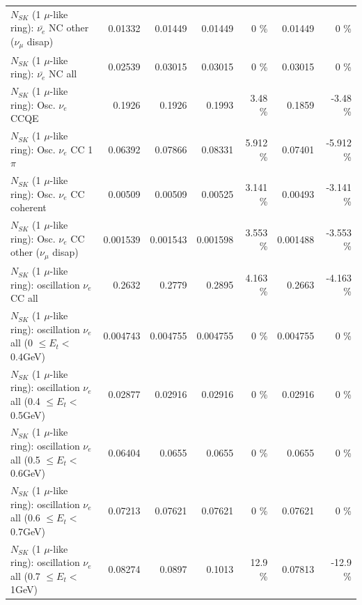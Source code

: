 \begin{table}
\begin{tabular}{| l | r | r | r  r | r  r |}
          $N_{SK}$ (1 $\mu$-like ring): $\bar{\nu_e}$ NC other ($\nu_\mu$ disap) &         0.01332 &         0.01449 &         0.01449 &        0 \%  &         0.01449 &        0 \%  \\ 
                            $N_{SK}$ (1 $\mu$-like ring): $\bar{\nu_{e}}$ NC all &         0.02539 &         0.03015 &         0.03015 &        0 \%  &         0.03015 &        0 \%  \\ 
\hline
\hline
\hline
                                 $N_{SK}$ (1 $\mu$-like ring): Osc. $\nu_e$ CCQE &          0.1926 &          0.1926 &          0.1993 &     3.48 \%  &          0.1859 &    -3.48 \%  \\ 
                            $N_{SK}$ (1 $\mu$-like ring): Osc. $\nu_e$ CC 1$\pi$ &         0.06392 &         0.07866 &         0.08331 &    5.912 \%  &         0.07401 &   -5.912 \%  \\ 
                          $N_{SK}$ (1 $\mu$-like ring): Osc. $\nu_e$ CC coherent &         0.00509 &         0.00509 &         0.00525 &    3.141 \%  &         0.00493 &   -3.141 \%  \\ 
           $N_{SK}$ (1 $\mu$-like ring): Osc. $\nu_e$ CC other ($\nu_\mu$ disap) &        0.001539 &        0.001543 &        0.001598 &    3.553 \%  &        0.001488 &   -3.553 \%  \\ 
                        $N_{SK}$ (1 $\mu$-like ring): oscillation $\nu_e$ CC all &          0.2632 &          0.2779 &          0.2895 &    4.163 \%  &          0.2663 &   -4.163 \%  \\ 
\hline
$N_{SK}$ (1 $\mu$-like ring): oscillation $\nu_{e}$ all (0 $\leq E_{t} <$ 0.4GeV) &        0.004743 &        0.004755 &        0.004755 &        0 \%  &        0.004755 &        0 \%  \\ 
$N_{SK}$ (1 $\mu$-like ring): oscillation $\nu_{e}$ all (0.4 $\leq E_{t} <$ 0.5GeV) &         0.02877 &         0.02916 &         0.02916 &        0 \%  &         0.02916 &        0 \%  \\ 
$N_{SK}$ (1 $\mu$-like ring): oscillation $\nu_{e}$ all (0.5 $\leq E_{t} <$ 0.6GeV) &         0.06404 &          0.0655 &          0.0655 &        0 \%  &          0.0655 &        0 \%  \\ 
$N_{SK}$ (1 $\mu$-like ring): oscillation $\nu_{e}$ all (0.6 $\leq E_{t} <$ 0.7GeV) &         0.07213 &         0.07621 &         0.07621 &        0 \%  &         0.07621 &        0 \%  \\ 
$N_{SK}$ (1 $\mu$-like ring): oscillation $\nu_{e}$ all (0.7 $\leq E_{t} <$ 1GeV) &         0.08274 &          0.0897 &          0.1013 &     12.9 \%  &         0.07813 &    -12.9 \%  \\ 

\end{tabular}
\end{table}
